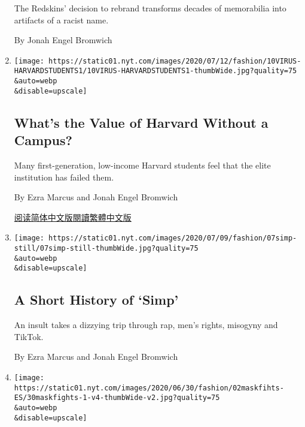 \begin{enumerate}
  The Redskins' decision to rebrand transforms decades of memorabilia
  into artifacts of a racist name.

  By Jonah Engel Bromwich
\item
  \href{/2020/07/11/style/harvard-students-coronavirus.html}{}

  \texttt{[image: https://static01.nyt.com/images/2020/07/12/fashion/10VIRUS-HARVARDSTUDENTS1/10VIRUS-HARVARDSTUDENTS1-thumbWide.jpg?quality=75\\\&auto=webp\\\&disable=upscale]}

  \hypertarget{whats-the-value-of-harvard-without-a-campus}{%
  \subsection{What's the Value of Harvard Without a
  Campus?}\label{whats-the-value-of-harvard-without-a-campus}}

  Many first-generation, low-income Harvard students feel that the elite
  institution has failed them.

  By Ezra Marcus and Jonah Engel Bromwich

  \href{https://cn.nytimes.com/education/20200713/harvard-students-coronavirus/}{阅读简体中文版}\href{https://cn.nytimes.com/education/20200713/harvard-students-coronavirus/zhh-hant/}{閱讀繁體中文版}
\item
  \href{/2020/07/07/style/simp-history-slang.html}{}

  \texttt{[image: https://static01.nyt.com/images/2020/07/09/fashion/07simp-still/07simp-still-thumbWide.jpg?quality=75\\\&auto=webp\\\&disable=upscale]}

  \hypertarget{a-short-history-of-simp}{%
  \subsection{A Short History of `Simp'}\label{a-short-history-of-simp}}

  An insult takes a dizzying trip through rap, men's rights, misogyny
  and TikTok.

  By Ezra Marcus and Jonah Engel Bromwich
\item
  \href{/es/2020/07/02/espanol/cubrebocas-pelea-tiendas-video.html}{}

  \texttt{[image: https://static01.nyt.com/images/2020/06/30/fashion/02maskfihts-ES/30maskfights-1-v4-thumbWide-v2.jpg?quality=75\\\&auto=webp\\\&disable=upscale]}

  \hypertarget{a-puuxf1etazos-por-no-llevar-un-cubrebocas-la-nueva-guerra-estadounidense}{%
}
\end{enumerate}

